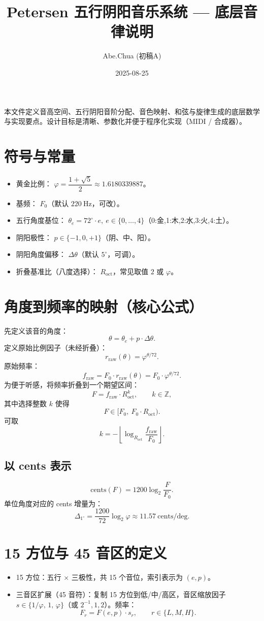 \documentclass{article}
\title{Petersen 五行阴阳音乐系统 — 底层音律说明}
\author{Abe.Chua (初稿A)}
\date{2025-08-25}
\begin{document}
\maketitle

本文件定义音高空间、五行阴阳音阶分配、音色映射、和弦与旋律生成的底层数学与实现要点。设计目标是清晰、参数化并便于程序化实现（MIDI / 合成器）。

\section{符号与常量}
\begin{itemize}
  \item 黄金比例： $\varphi=\dfrac{1+\sqrt{5}}{2}\approx1.6180339887$。
  \item 基频： $F_0$（默认 $220\ \mathrm{Hz}$，可改）。
  \item 五行角度基位： $\theta_e=72^\circ\cdot e,\ e\in\{0,\dots,4\}$（0:金,1:木,2:水,3:火,4:土）。
  \item 阴阳极性： $p\in\{-1,0,+1\}$（阴、中、阳）。
  \item 阴阳角度偏移： $\Delta\theta$（默认 $5^\circ$，可调）。
  \item 折叠基准比（八度选择）： $R_{\mathrm{oct}}$，常见取值 $2$ 或 $\varphi$。
\end{itemize}

\section{角度到频率的映射（核心公式）}
先定义该音的角度：
\[
\theta = \theta_e + p\cdot\Delta\theta .
\]
定义原始比例因子（未经折叠）：
\[
r_{\mathrm{raw}}(\theta)=\varphi^{\theta/72}.
\]
原始频率：
\[
f_{\mathrm{raw}} = F_{0}\cdot r_{\mathrm{raw}}(\theta) = F_{0}\cdot \varphi^{\theta/72}.
\]
为便于听感，将频率折叠到一个期望区间：
\[
F = f_{\mathrm{raw}}\cdot R_{\mathrm{oct}}^{k},\qquad k\in\mathbb{Z},
\]
其中选择整数 $k$ 使得
\[
F\in [F_{0},\ F_{0}\cdot R_{\mathrm{oct}}).
\]
可取
\[
k = -\left\lfloor \log_{R_{\mathrm{oct}}}\dfrac{f_{\mathrm{raw}}}{F_{0}} \right\rfloor.
\]

\subsection{以 cents 表示}
\[
\mathrm{cents}(F) = 1200\log_2\frac{F}{F_0}.
\]
单位角度对应的 cents 增量为：
\[
\Delta_{\text{1}^\circ} = \frac{1200}{72}\log_2\varphi \approx 11.57\ \text{cents/deg}.
\]

\section{15 方位与 45 音区的定义}
\begin{itemize}
  \item 15 方位：五行 $\times$ 三极性，共 15 个音位，索引表示为 $(e,p)$。
  \item 三音区扩展（45 音符）：复制 15 方位到低/中/高区，音区缩放因子 $s\in\{1/\varphi,\,1,\,\varphi\}$（或 $2^{-1},1,2$）。频率：
  \[
  F_{r} = F(e,p)\cdot s_r,\qquad r\in\{L,M,H\}.
  \]
\end{itemize}
\end{document}
